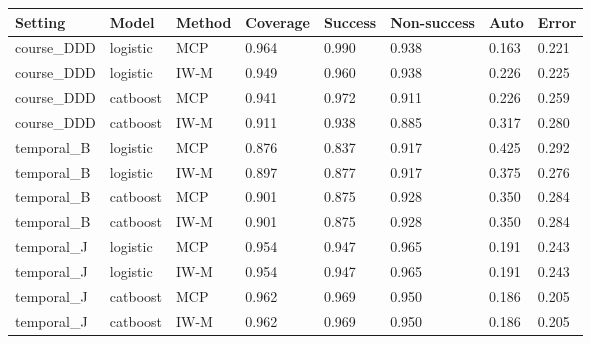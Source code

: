 \begin{tabular}{llllllll}
\toprule
Setting & Model & Method & Coverage & Success & Non-success & Auto & Error\\
\midrule
course\_DDD & logistic & MCP & 0.964 & 0.990 & 0.938 & 0.163 & 0.221\\
course\_DDD & logistic & IW-M & 0.949 & 0.960 & 0.938 & 0.226 & 0.225\\
course\_DDD & catboost & MCP & 0.941 & 0.972 & 0.911 & 0.226 & 0.259\\
course\_DDD & catboost & IW-M & 0.911 & 0.938 & 0.885 & 0.317 & 0.280\\
temporal\_B & logistic & MCP & 0.876 & 0.837 & 0.917 & 0.425 & 0.292\\
temporal\_B & logistic & IW-M & 0.897 & 0.877 & 0.917 & 0.375 & 0.276\\
temporal\_B & catboost & MCP & 0.901 & 0.875 & 0.928 & 0.350 & 0.284\\
temporal\_B & catboost & IW-M & 0.901 & 0.875 & 0.928 & 0.350 & 0.284\\
temporal\_J & logistic & MCP & 0.954 & 0.947 & 0.965 & 0.191 & 0.243\\
temporal\_J & logistic & IW-M & 0.954 & 0.947 & 0.965 & 0.191 & 0.243\\
temporal\_J & catboost & MCP & 0.962 & 0.969 & 0.950 & 0.186 & 0.205\\
temporal\_J & catboost & IW-M & 0.962 & 0.969 & 0.950 & 0.186 & 0.205\\
\bottomrule
\end{tabular}